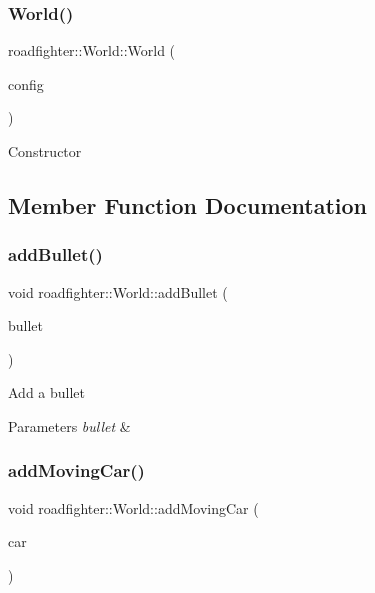 \subsubsection{\texorpdfstring{World()}{World()}}
{\footnotesize\ttfamily roadfighter\+::\+World\+::\+World (\begin{DoxyParamCaption}\item[{std\+::shared\+\_\+ptr$<$ \hyperlink{classConfigData}{Config\+Data} $>$}]{config }\end{DoxyParamCaption})}

Constructor 

\subsection{Member Function Documentation}
\mbox{\label{classroadfighter_1_1World_a258d294a9b5ed0baf09b9370a5c45e9b}} 
\subsubsection{\texorpdfstring{add\+Bullet()}{addBullet()}}
{\footnotesize\ttfamily void roadfighter\+::\+World\+::add\+Bullet (\begin{DoxyParamCaption}\item[{std\+::shared\+\_\+ptr$<$ \hyperlink{classroadfighter_1_1Entity}{roadfighter\+::\+Entity} $>$}]{bullet }\end{DoxyParamCaption})}

Add a bullet 
\begin{DoxyParams}{Parameters}
{\em bullet} & \\
\hline
\end{DoxyParams}
\mbox{\label{classroadfighter_1_1World_a37c625e97a3de066ca8d2c7fced431a9}} 
\subsubsection{\texorpdfstring{add\+Moving\+Car()}{addMovingCar()}}
{\footnotesize\ttfamily void roadfighter\+::\+World\+::add\+Moving\+Car (\begin{DoxyParamCaption}\item[{std\+::shared\+\_\+ptr$<$ \hyperlink{classroadfighter_1_1Entity}{roadfighter\+::\+Entity} $>$}]{car }\end{DoxyParamCaption})}

